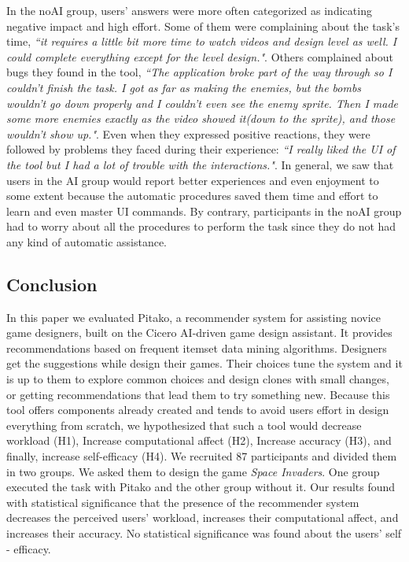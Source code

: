 \documentclass[letterpaper]{article} %
\begin{document}
In the noAI group, users' answers were more often categorized as indicating negative impact and high effort. Some of them were complaining about the task's time, \textit{``it requires a little bit more time to watch videos and design level as well. I could complete everything except for the level design."}. Others complained about bugs they found in the tool, \textit{``The application broke part of the way through so I couldn't finish the task. I got as far as making the enemies, but the bombs wouldn't go down properly and I couldn't even see the enemy sprite. Then I made some more enemies exactly as the video showed it(down to the sprite), and those wouldn't show up."}. Even when they expressed positive reactions, they were followed by problems they faced during their experience: \textit{``I really liked the UI of the tool but I had a lot of trouble with the interactions."}.  In general, we saw that users in the AI group would report better experiences and even enjoyment to some extent because the automatic procedures saved them time and effort to learn and even master UI commands. By contrary, participants in the noAI group had to worry about all the procedures to perform the task since they do not had any kind of automatic assistance. %

\subsection{Conclusion}
In this paper we evaluated Pitako, a recommender system for assisting novice game designers, built on the Cicero AI-driven game design assistant. It provides recommendations based on frequent itemset data mining algorithms. Designers get the suggestions while design their games. Their choices tune the system and it is up to them to explore common choices and design clones with small changes, or getting recommendations that lead them to try something new.
Because this tool offers components already created and tends to avoid users effort in design everything from scratch, we hypothesized that such a tool would decrease workload (H1), Increase computational affect (H2), Increase accuracy (H3), and finally, increase self-efficacy (H4).  We recruited 87 participants and divided them in two groups. We asked them to design the game \textit{Space Invaders}. One group executed the task with Pitako and the other group without it.
Our results found with statistical significance that the presence of the recommender system decreases the perceived users' workload, increases their computational affect, and increases their accuracy. No statistical significance was found about the users' self - efficacy.
\end{document}

